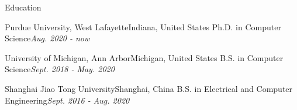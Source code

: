 \documentclass{resume} %
\begin{document}

\begin{rSection}{\large Education}
  \begin{rSubsection*}
    {Purdue University, West Lafayette}{Indiana, United States}
    {Ph.D. in Computer Science}{\textit{Aug. 2020 - now}}
  \end{rSubsection*}

  \begin{rSubsection*}
    {University of Michigan, Ann Arbor}{Michigan, United States}
    {B.S. in Computer Science}{\textit{Sept. 2018 - May. 2020}}
  \end{rSubsection*}

  \begin{rSubsection*}{Shanghai Jiao Tong University}{Shanghai, China}
  {B.S. in Electrical and Computer Engineering}{\textit {Sept. 2016 - Aug. 2020}}
  \end{rSubsection*}

\end{rSection}
\end{document}
